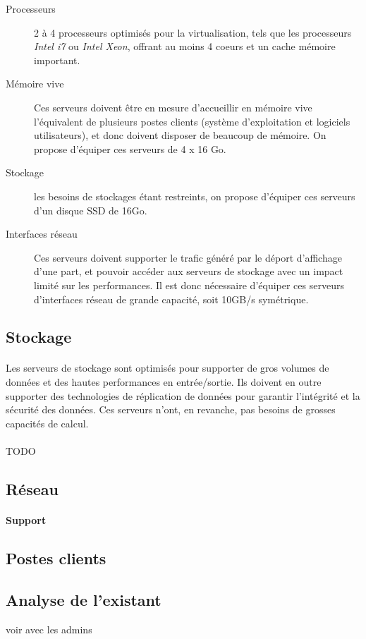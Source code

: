 \begin{description}
  \item[Processeurs] 2 à 4 processeurs optimisés pour la virtualisation, tels
  que les processeurs \emph{Intel i7} ou \emph{Intel Xeon}, offrant au moins 4
  coeurs et un cache mémoire important.
  \item[Mémoire vive] Ces serveurs doivent être en mesure d'accueillir en
  mémoire vive l'équivalent de plusieurs postes clients (système
  d'exploitation et logiciels utilisateurs), et donc doivent disposer de
  beaucoup de mémoire. On propose d'équiper ces serveurs de 4 x 16 Go.
  \item[Stockage] les besoins de stockages étant restreints, on propose
  d'équiper ces serveurs d'un disque SSD de 16Go.
  \item[Interfaces réseau] Ces serveurs doivent supporter le trafic généré par
  le déport d'affichage d'une part, et pouvoir accéder aux serveurs de stockage
  avec un impact limité sur les performances. Il est donc nécessaire d'équiper
  ces serveurs d'interfaces réseau de grande capacité, soit 10GB/s symétrique.
\end{description}

\subsection{Stockage}

\paragraph{} Les serveurs de stockage sont optimisés pour supporter de gros
volumes de données et des hautes performances en entrée/sortie. Ils doivent en
outre supporter des technologies de réplication de données pour garantir
l'intégrité et la sécurité des données. Ces serveurs n'ont, en revanche, pas
besoins de grosses capacités de calcul.

\paragraph{} TODO

\subsection{Réseau}

\paragraph{Support}

\subsection{Postes clients}

\subsection{Analyse de l'existant}

voir avec les admins
